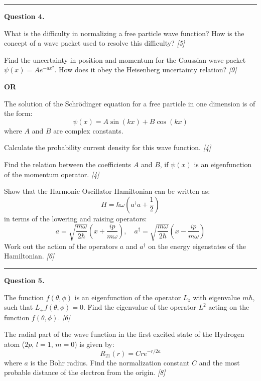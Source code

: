 \documentclass[11pt,a4paper]{article}
\newcommand{\pts}[1]{\hfill   \textit{[#1]}}
\begin{document}
\medskip\rule{\linewidth}{0.2pt}




\noindent   \textbf{Question 4.}

\begin{parts}
  \item What is the difficulty in normalizing a free particle wave function? How is the concept of a wave packet used to resolve this difficulty? \pts{5}
  \item Find the uncertainty in position and momentum for the Gaussian wave packet $\psi(x) = A e^{-a x^2}$. How does it obey the Heisenberg uncertainty relation? \pts{9}
\end{parts}
\hfill   \textbf{OR}

\begin{parts}
  \item The solution of the Schr\"{o}dinger equation for a free particle in one dimension is of the form:
    \[ \psi(x) = A \sin(kx) + B \cos(kx) \]
    where $A$ and $B$ are complex constants.
    
\begin{parts}
      \item Calculate the probability current density for this wave function. \pts{4}
      \item Find the relation between the coefficients $A$ and $B$, if $\psi(x)$ is an eigenfunction of the momentum operator. \pts{4}
    \end{parts}
  \item Show that the Harmonic Oscillator Hamiltonian can be written as:
    \[ H = \hbar\omega \left( a^{\dagger}a + \frac{1}{2} \right) \]
    in terms of the lowering and raising operators:
    \[ a = \sqrt{\frac{m\omega}{2\hbar}} \left( x + \frac{ip}{m\omega} \right), \quad a^{\dagger} = \sqrt{\frac{m\omega}{2\hbar}} \left( x - \frac{ip}{m\omega} \right) \]
    Work out the action of the operators $a$ and $a^{\dagger}$ on the energy eigenstates of the Hamiltonian. \pts{6}
\end{parts}

\medskip\rule{\linewidth}{0.2pt}




\noindent   \textbf{Question 5.}

\begin{parts}
  \item The function $f( \theta,\phi)$ is an eigenfunction of the operator $L_z$ with eigenvalue $m\hbar$, such that $L_+ f( \theta,\phi) = 0$. Find the eigenvalue of the operator $L^2$ acting on the function $f( \theta,\phi)$. \pts{6}
  \item The radial part of the wave function in the first excited state of the Hydrogen atom ($2p$, $l=1$, $m=0$) is given by:
    \[ R_{21}(r) = C r e^{-r/2a} \]
    where $a$ is the Bohr radius. Find the normalization constant $C$ and the most probable distance of the electron from the origin. \pts{8}
\end{parts}
\end{document}
